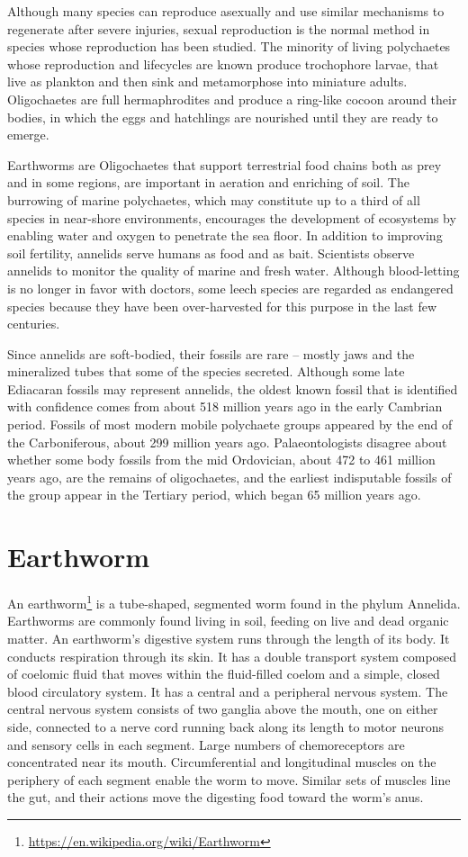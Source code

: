 \documentclass[]{book}
\let\rmarkdownfootnote\footnote%
\def\footnote{\protect\rmarkdownfootnote}
\renewcommand{\href}[2]{#2\footnote{\url{#1}}}
\theoremstyle{definition}
\theoremstyle{definition}
\theoremstyle{definition}
\theoremstyle{remark}
\begin{document}
Although many species can reproduce asexually and use similar mechanisms
to regenerate after severe injuries, sexual reproduction is the normal
method in species whose reproduction has been studied. The minority of
living polychaetes whose reproduction and lifecycles are known produce
trochophore larvae, that live as plankton and then sink and metamorphose
into miniature adults. Oligochaetes are full hermaphrodites and produce
a ring-like cocoon around their bodies, in which the eggs and hatchlings
are nourished until they are ready to emerge.

Earthworms are Oligochaetes that support terrestrial food chains both as
prey and in some regions, are important in aeration and enriching of
soil. The burrowing of marine polychaetes, which may constitute up to a
third of all species in near-shore environments, encourages the
development of ecosystems by enabling water and oxygen to penetrate the
sea floor. In addition to improving soil fertility, annelids serve
humans as food and as bait. Scientists observe annelids to monitor the
quality of marine and fresh water. Although blood-letting is no longer
in favor with doctors, some leech species are regarded as endangered
species because they have been over-harvested for this purpose in the
last few centuries.

Since annelids are soft-bodied, their fossils are rare -- mostly jaws
and the mineralized tubes that some of the species secreted. Although
some late Ediacaran fossils may represent annelids, the oldest known
fossil that is identified with confidence comes from about 518 million
years ago in the early Cambrian period. Fossils of most modern mobile
polychaete groups appeared by the end of the Carboniferous, about 299
million years ago. Palaeontologists disagree about whether some body
fossils from the mid Ordovician, about 472 to 461 million years ago, are
the remains of oligochaetes, and the earliest indisputable fossils of
the group appear in the Tertiary period, which began 65 million years
ago.

\section{Earthworm}\label{earthworm}

An \href{https://en.wikipedia.org/wiki/Earthworm}{earthworm} is a
tube-shaped, segmented worm found in the phylum Annelida. Earthworms are
commonly found living in soil, feeding on live and dead organic matter.
An earthworm's digestive system runs through the length of its body. It
conducts respiration through its skin. It has a double transport system
composed of coelomic fluid that moves within the fluid-filled coelom and
a simple, closed blood circulatory system. It has a central and a
peripheral nervous system. The central nervous system consists of two
ganglia above the mouth, one on either side, connected to a nerve cord
running back along its length to motor neurons and sensory cells in each
segment. Large numbers of chemoreceptors are concentrated near its
mouth. Circumferential and longitudinal muscles on the periphery of each
segment enable the worm to move. Similar sets of muscles line the gut,
and their actions move the digesting food toward the worm's anus.
\end{document}
